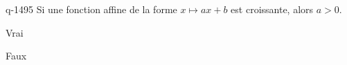 \begin{truefalse}{q-1495}
Si une fonction affine de la forme $x\mapsto ax+b$ est croissante, alors $a>0$.
\item Vrai
\item* Faux
\end{truefalse}

